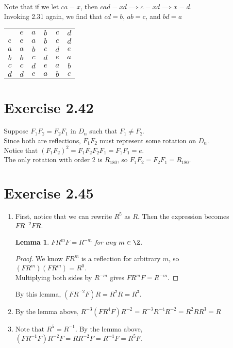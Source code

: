 \documentclass{article}
\newtheorem*{lemma}{Lemma}
\begin{document}
Note that if we let \(ca=x\), then \(cad=xd\implies c=xd\implies x=d\). \\
Invoking 2.31 again, we find that \(cd=b\), \(ab=c\), and \(bd=a\)
\begin{center}
    \begin{tabular}{c | c c c c c}
        & $e$ & $a$ & $b$ & $c$ & $d$  \\
       \cline{1-6}
       $e$ & $e$ & $a$ & $b$ & $c$ & $d$ \\
       $a$ & $a$ & $b$ & $c$ & $d$ & $e$ \\
       $b$ & $b$ & $c$ & $d$ & $e$ & $a$ \\
       $c$ & $c$ & $d$ & $e$ & $a$ & $b$ \\
       $d$ & $d$ & $e$ & $a$ & $b$ & $c$ \\
   \end{tabular}
\end{center}

\section*{Exercise 2.42}
Suppose \(F_1F_2 = F_2F_1\) in \(D_n\) such that \(F_1\neq F_2\). \\
Since both are reflections, \(F_1F_2\) must represent some rotation on \(D_n\). \\
Notice that \((F_1F_2)^2=F_1F_2F_2F_1=F_1F_1=e\). \\
The only rotation with order 2 is \(R_{180}\), so \(F_1F_2=F_2F_1=R_{180}\).

\section*{Exercise 2.45}
\begin{enumerate}[label=(\alph*)]
    \item First, notice that we can rewrite \(R^5\) as \(R\). Then the expression becomes \(FR^{-2}FR\).
    \begin{lemma}
        \(FR^mF=R^{-m}\) for any \(m\in\Z\).
    \end{lemma}
    \begin{proof}
        We know \(FR^m\) is a reflection for arbitrary \(m\), so \((FR^m)(FR^m)=R^0\). \\
        Multiplying both sides by \(R^{-m}\) gives \(FR^mF=R^{-m}\).
    \end{proof}
    By this lemma, \((FR^{-2}F)R=R^2R=R^3\).
    \item By the lemma above, \(R^{-3}(FR^4F)R^{-2}=R^{-3}R^{-4}R^{-2}=R^2RR^3=R\)
    \item Note that \(R^5=R^{-1}\). By the lemma above, \((FR^{-1}F)R^{-2}F=RR^{-2}F=R^{-1}F=R^5F\).
\end{enumerate}
\end{document}
